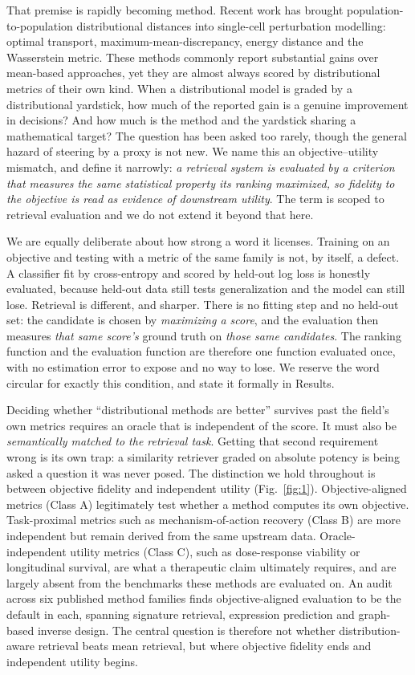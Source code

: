\documentclass[11pt,letterpaper]{article}
\begin{document}
That premise is rapidly becoming method. Recent work has brought population-to-population distributional distances into single-cell perturbation modelling: optimal transport, maximum-mean-discrepancy, energy distance and the Wasserstein metric. These methods commonly report substantial gains over mean-based approaches, yet they are almost always scored by distributional metrics of their own kind. When a distributional model is graded by a distributional yardstick, how much of the reported gain is a genuine improvement in decisions? And how much is the method and the yardstick sharing a mathematical target? The question has been asked too rarely\cite{ref3,ref13,ref15}, though the general hazard of steering by a proxy is not new\cite{MetricGaming}. We name this an objective--utility mismatch, and define it narrowly: \emph{a retrieval system is evaluated by a criterion that measures the same statistical property its ranking maximized, so fidelity to the objective is read as evidence of downstream utility}. The term is scoped to retrieval evaluation and we do not extend it beyond that here.

We are equally deliberate about how strong a word it licenses. Training on an objective and testing with a metric of the same family is not, by itself, a defect. A classifier fit by cross-entropy and scored by held-out log loss is honestly evaluated, because held-out data still tests generalization and the model can still lose. Retrieval is different, and sharper. There is no fitting step and no held-out set: the candidate is chosen by \emph{maximizing a score}, and the evaluation then measures \emph{that same score's} ground truth on \emph{those same candidates}. The ranking function and the evaluation function are therefore one function evaluated once, with no estimation error to expose and no way to lose. We reserve the word circular for exactly this condition, and state it formally in Results.

Deciding whether ``distributional methods are better'' survives past the field's own metrics requires an oracle that is independent of the score. It must also be \emph{semantically matched to the retrieval task}. Getting that second requirement wrong is its own trap: a similarity retriever graded on absolute potency is being asked a question it was never posed. The distinction we hold throughout is between objective fidelity and independent utility (Fig.~\ref{fig:1}). Objective-aligned metrics (Class A) legitimately test whether a method computes its own objective. Task-proximal metrics such as mechanism-of-action recovery (Class B) are more independent but remain derived from the same upstream data. Oracle-independent utility metrics (Class C), such as dose-response viability or longitudinal survival, are what a therapeutic claim ultimately requires, and are largely absent from the benchmarks these methods are evaluated on. An audit across six published method families finds objective-aligned evaluation to be the default in each, spanning signature retrieval\cite{ref1,ref2}, expression prediction\cite{ref4,ref5,ref6} and graph-based inverse design\cite{ref10,ref11,ref12}. The central question is therefore not whether distribution-aware retrieval beats mean retrieval, but where objective fidelity ends and independent utility begins.
\end{document}
